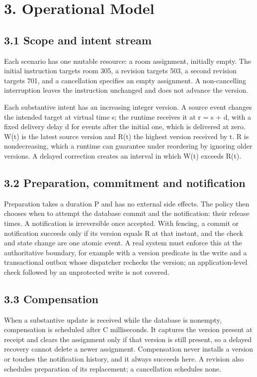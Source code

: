 \documentclass[review,12pt]{elsarticle}
\begin{document}
\section*{3. Operational Model}

\subsection*{3.1 Scope and intent stream}

Each scenario has one mutable resource: a room assignment, initially empty. The initial instruction targets room 305, a revision targets 503, a second revision targets 701, and a cancellation specifies an empty assignment. A non-cancelling interruption leaves the instruction unchanged and does not advance the version.


Each substantive intent has an increasing integer version. A source event changes the intended target at virtual time s; the runtime receives it at r = s + d, with a fixed delivery delay d for events after the initial one, which is delivered at zero. W(t) is the latest source version and R(t) the highest version received by t. R is nondecreasing, which a runtime can guarantee under reordering by ignoring older versions. A delayed correction creates an interval in which W(t) exceeds R(t).


\subsection*{3.2 Preparation, commitment and notification}

Preparation takes a duration P and has no external side effects. The policy then chooses when to attempt the database commit and the notification: their release times. A notification is irreversible once accepted. With fencing, a commit or notification succeeds only if its version equals R at that instant, and the check and state change are one atomic event. A real system must enforce this at the authoritative boundary, for example with a version predicate in the write and a transactional outbox whose dispatcher rechecks the version; an application-level check followed by an unprotected write is not covered.


\subsection*{3.3 Compensation}

When a substantive update is received while the database is nonempty, compensation is scheduled after C milliseconds. It captures the version present at receipt and clears the assignment only if that version is still present, so a delayed recovery cannot delete a newer assignment. Compensation never installs a version or touches the notification history, and it always succeeds here. A revision also schedules preparation of its replacement; a cancellation schedules none.
\end{document}
